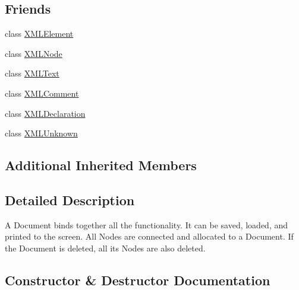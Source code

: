\subsection*{Friends}
\begin{DoxyCompactItemize}
\item 
class \mbox{\hyperlink{classtinyxml2_1_1_x_m_l_document_ac2fba9b6e452829dd892f7392c24e0eb}{X\+M\+L\+Element}}
\item 
class \mbox{\hyperlink{classtinyxml2_1_1_x_m_l_document_a8233f9dc4d61d90e93be2a3647c6d957}{X\+M\+L\+Node}}
\item 
class \mbox{\hyperlink{classtinyxml2_1_1_x_m_l_document_ae50b59416e98bbe7e4bc87df40092109}{X\+M\+L\+Text}}
\item 
class \mbox{\hyperlink{classtinyxml2_1_1_x_m_l_document_acee9e261162d4236fb2c30312c54cd4c}{X\+M\+L\+Comment}}
\item 
class \mbox{\hyperlink{classtinyxml2_1_1_x_m_l_document_a93d2c2c2db3973083b7d6e7f6f358160}{X\+M\+L\+Declaration}}
\item 
class \mbox{\hyperlink{classtinyxml2_1_1_x_m_l_document_a6946948274f7a02f5e69b5dbeaea9b35}{X\+M\+L\+Unknown}}
\end{DoxyCompactItemize}
\subsection*{Additional Inherited Members}


\subsection{Detailed Description}
A Document binds together all the functionality. It can be saved, loaded, and printed to the screen. All Nodes are connected and allocated to a Document. If the Document is deleted, all its Nodes are also deleted. 

\subsection{Constructor \& Destructor Documentation}
\mbox{\label{classtinyxml2_1_1_x_m_l_document_a57ddf17b6e054dda10af98991b1b8f70}} 
